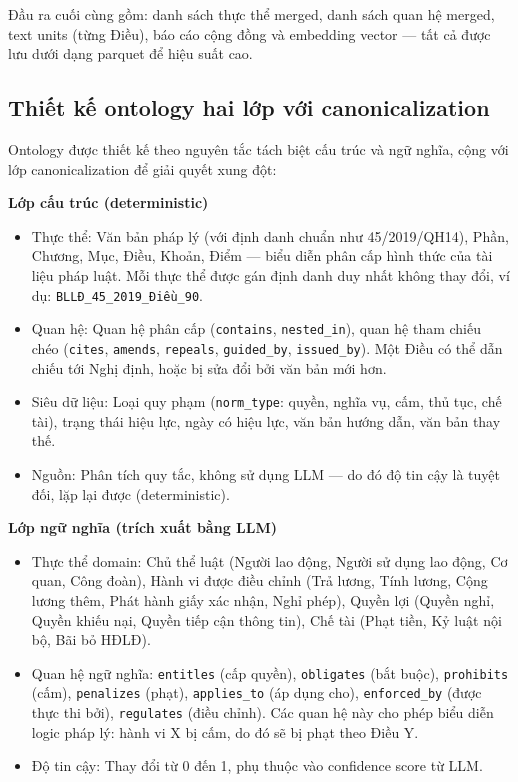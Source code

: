 \documentclass[../DoAn.tex]{subfiles}
\begin{document}
Đầu ra cuối cùng gồm: danh sách thực thể merged, danh sách quan hệ merged, text units (từng Điều), báo cáo cộng đồng và embedding vector --- tất cả được lưu dưới dạng parquet để hiệu suất cao.

\subsection{Thiết kế ontology hai lớp với canonicalization}
\label{subsection:3.2.2}

Ontology được thiết kế theo nguyên tắc tách biệt cấu trúc và ngữ nghĩa, cộng với lớp canonicalization để giải quyết xung đột:

\textbf{Lớp cấu trúc (deterministic)}
\begin{itemize}[nosep, leftmargin=*]
    \item Thực thể: Văn bản pháp lý (với định danh chuẩn như 45/2019/QH14), Phần, Chương, Mục, Điều, Khoản, Điểm --- biểu diễn phân cấp hình thức của tài liệu pháp luật. Mỗi thực thể được gán định danh duy nhất không thay đổi, ví dụ: \texttt{BLLĐ\_45\_2019\_Điều\_90}.
    \item Quan hệ: Quan hệ phân cấp (\texttt{contains}, \texttt{nested\_in}), quan hệ tham chiếu chéo (\texttt{cites}, \texttt{amends}, \texttt{repeals}, \texttt{guided\_by}, \texttt{issued\_by}). Một Điều có thể dẫn chiếu tới Nghị định, hoặc bị sửa đổi bởi văn bản mới hơn.
    \item Siêu dữ liệu: Loại quy phạm (\texttt{norm\_type}: quyền, nghĩa vụ, cấm, thủ tục, chế tài), trạng thái hiệu lực, ngày có hiệu lực, văn bản hướng dẫn, văn bản thay thế.
    \item Nguồn: Phân tích quy tắc, không sử dụng LLM --- do đó độ tin cậy là tuyệt đối, lặp lại được (deterministic).
\end{itemize}

\textbf{Lớp ngữ nghĩa (trích xuất bằng LLM)}
\begin{itemize}[nosep, leftmargin=*]
    \item Thực thể domain: Chủ thể luật (Người lao động, Người sử dụng lao động, Cơ quan, Công đoàn), Hành vi được điều chỉnh (Trả lương, Tính lương, Cộng lương thêm, Phát hành giấy xác nhận, Nghỉ phép), Quyền lợi (Quyền nghỉ, Quyền khiếu nại, Quyền tiếp cận thông tin), Chế tài (Phạt tiền, Kỷ luật nội bộ, Bãi bỏ HĐLĐ).
    \item Quan hệ ngữ nghĩa: \texttt{entitles} (cấp quyền), \texttt{obligates} (bắt buộc), \texttt{prohibits} (cấm), \texttt{penalizes} (phạt), \texttt{applies\_to} (áp dụng cho), \texttt{enforced\_by} (được thực thi bởi), \texttt{regulates} (điều chỉnh). Các quan hệ này cho phép biểu diễn logic pháp lý: hành vi X bị cấm, do đó sẽ bị phạt theo Điều Y.
    \item Độ tin cậy: Thay đổi từ 0 đến 1, phụ thuộc vào confidence score từ LLM.
\end{itemize}
\end{document}
